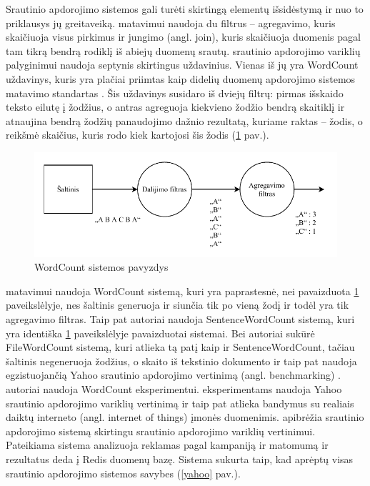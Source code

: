 \documentclass{VUMIFPSbakalaurinis}
\begin{document}
Srautinio apdorojimo sistemos gali turėti skirtingą elementų išsidėstymą ir nuo to priklausys jų greitaveiką. \cite{Karimov2018BenchmarkingDS} matavimui naudoja du filtrus – agregavimo, kuris skaičiuoja visus pirkimus ir jungimo (angl. join), kuris skaičiuoja duomenis pagal tam tikrą bendrą rodiklį iš abiejų duomenų srautų. \cite{Qian2016Benchmarking} srautinio apdorojimo variklių palyginimui naudoja septynis skirtingus uždavinius. Vienas iš jų yra WordCount uždavinys, kuris yra plačiai priimtas kaip didelių duomenų apdorojimo sistemos matavimo standartas \cite{huang2010hibench}. Šis uždavinys susidaro iš dviejų filtrų: pirmas išskaido teksto eilutę į žodžius, o antras agreguoja kiekvieno žodžio bendrą skaitiklį ir atnaujina bendrą žodžių panaudojimo dažnio rezultatą, kuriame raktas – žodis, o reikšmė skaičius, kuris rodo kiek kartojosi šis žodis (\ref{wordcount} pav.). 
\begin{figure}[H]
    \includegraphics[width=15cm]{img/wordcount.pdf}
    \caption{WordCount sistemos pavyzdys}
    \label{wordcount}
\end{figure} 
\cite{zhang2020heron} matavimui naudoja WordCount sistemą, kuri yra paprastesnė, nei pavaizduota \ref{wordcount} paveikslėlyje, nes šaltinis generuoja ir siunčia tik po vieną žodį ir todėl yra tik agregavimo filtras. Taip pat autoriai  naudoja SentenceWordCount sistemą, kuri yra identiška \ref{wordcount} paveikslėlyje pavaizduotai sistemai. Bei autoriai sukūrė FileWordCount sistemą, kuri atlieka tą patį kaip ir SentenceWordCount, tačiau šaltinis negeneruoja žodžius, o skaito iš tekstinio dokumento ir taip pat naudoja egzistuojančią Yahoo srautinio apdorojimo vertinimą (angl. benchmarking) \cite{Chintapalli2016Benchmarking}. \cite{dhalion} autoriai naudoja WordCount eksperimentui. \cite{vaquero2018autotuning} eksperimentams naudoja Yahoo srautinio apdorojimo variklių vertinimą \cite{Chintapalli2016Benchmarking} ir taip pat atlieka bandymus su realiais daiktų interneto (angl. internet of things) įmonės duomenimis. \cite{Chintapalli2016Benchmarking} apibrėžia srautinio apdorojimo sistemą skirtingu srautinio apdorojimo variklių vertinimui. Pateikiama sistema analizuoja reklamas pagal kampaniją ir matomumą ir rezultatus deda į Redis duomenų bazę. Sistema sukurta taip, kad aprėptų visas srautinio apdorojimo sistemos savybes (\ref{yahoo} pav.).
\end{document}
